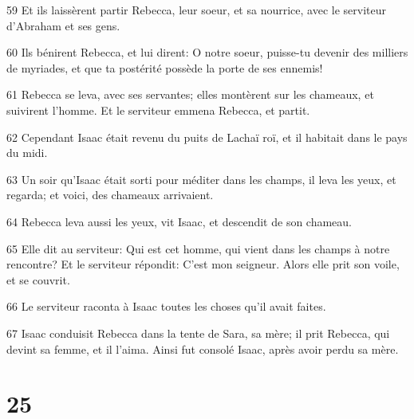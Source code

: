 \par 59 Et ils laissèrent partir Rebecca, leur soeur, et sa nourrice, avec le serviteur d'Abraham et ses gens.
\par 60 Ils bénirent Rebecca, et lui dirent: O notre soeur, puisse-tu devenir des milliers de myriades, et que ta postérité possède la porte de ses ennemis!
\par 61 Rebecca se leva, avec ses servantes; elles montèrent sur les chameaux, et suivirent l'homme. Et le serviteur emmena Rebecca, et partit.
\par 62 Cependant Isaac était revenu du puits de Lachaï roï, et il habitait dans le pays du midi.
\par 63 Un soir qu'Isaac était sorti pour méditer dans les champs, il leva les yeux, et regarda; et voici, des chameaux arrivaient.
\par 64 Rebecca leva aussi les yeux, vit Isaac, et descendit de son chameau.
\par 65 Elle dit au serviteur: Qui est cet homme, qui vient dans les champs à notre rencontre? Et le serviteur répondit: C'est mon seigneur. Alors elle prit son voile, et se couvrit.
\par 66 Le serviteur raconta à Isaac toutes les choses qu'il avait faites.
\par 67 Isaac conduisit Rebecca dans la tente de Sara, sa mère; il prit Rebecca, qui devint sa femme, et il l'aima. Ainsi fut consolé Isaac, après avoir perdu sa mère.

\chapter{25}

